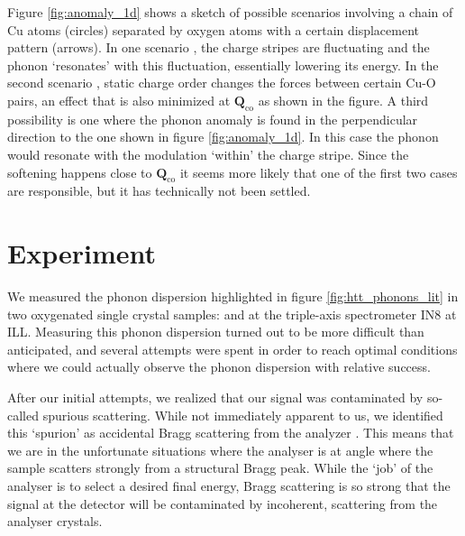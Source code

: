 Figure \ref{fig:anomaly_1d} shows a sketch of possible scenarios involving a chain of Cu atoms (circles) separated by oxygen atoms with a certain displacement pattern (arrows). In one scenario \cite{Kaneshita2002}, the charge stripes are fluctuating and the phonon `resonates' with this fluctuation, essentially lowering its energy. In the second scenario \cite{Reznik2006}, static charge order changes the forces between certain Cu-O pairs, an effect that is also minimized at $\bm{Q}_\text{co}$ as shown in the figure. A third possibility is one where the phonon anomaly is found in the perpendicular direction to the one shown in figure \ref{fig:anomaly_1d}. In this case the phonon would resonate with the modulation `within' the charge stripe. Since the softening happens close to $\bm{Q}_\text{co}$ it seems more likely that one of the first two cases are responsible, but it has technically not been settled.

\section{Experiment}
We measured the phonon dispersion highlighted in figure \ref{fig:htt_phonons_lit} in two oxygenated single crystal samples: \LCOO{} and \LSCOOsix{} at the triple-axis spectrometer IN8 at ILL. Measuring this phonon dispersion turned out to be more difficult than anticipated, and several attempts were spent in order to reach optimal conditions where we could actually observe the phonon dispersion with relative success.

After our initial attempts, we realized that our signal was contaminated by so-called spurious scattering. While not immediately apparent to us, we identified this `spurion' as accidental Bragg scattering from the analyzer \cite{Shirane2002}. This means that we are in the unfortunate situations where the analyser is at angle where the sample scatters strongly from a structural Bragg peak. While the `job' of the analyser is to select a desired final energy, Bragg scattering is so strong that the signal at the detector will be contaminated by incoherent, scattering from the analyser crystals.

